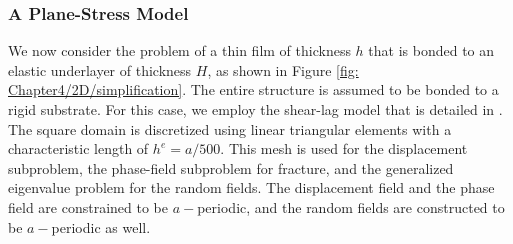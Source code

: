 \subsubsection{A Plane-Stress Model}

We now consider the problem of a thin film of thickness $h$ that is bonded to an elastic underlayer of thickness $H$, as shown in Figure \ref{fig: Chapter4/2D/simplification}.  The entire structure is assumed to be bonded to a rigid substrate. For this case, we employ the shear-lag model that is detailed in \cite{liang2003evolving}.  The square domain is discretized using linear triangular elements with a characteristic length of $h^e = a/500$. This  mesh is used for the displacement subproblem, the phase-field subproblem for fracture, and the generalized eigenvalue problem for the random fields. The displacement field and the phase field are constrained to be $a-$periodic, and the random fields are constructed to be $a-$periodic as well.



